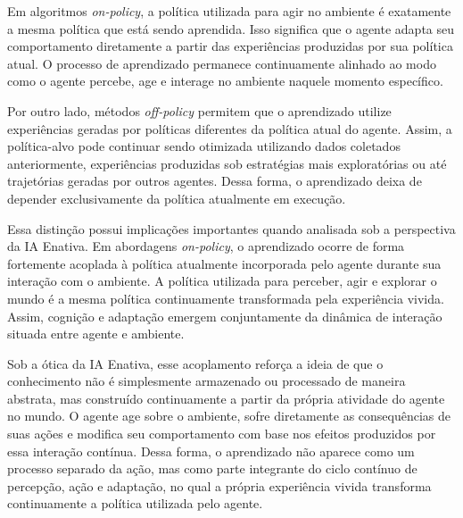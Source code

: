 Em algoritmos \textit{on-policy}, a política utilizada para agir no ambiente é exatamente a mesma política que está sendo aprendida. Isso significa que o agente adapta seu comportamento diretamente a partir das experiências produzidas por sua política atual. O processo de aprendizado permanece continuamente alinhado ao modo como o agente percebe, age e interage no ambiente naquele momento específico.

Por outro lado, métodos \textit{off-policy} permitem que o aprendizado utilize experiências geradas por políticas diferentes da política atual do agente. Assim, a política-alvo pode continuar sendo otimizada utilizando dados coletados anteriormente, experiências produzidas sob estratégias mais exploratórias ou até trajetórias geradas por outros agentes. Dessa forma, o aprendizado deixa de depender exclusivamente da política atualmente em execução.



Essa distinção possui implicações importantes quando analisada sob a perspectiva da IA Enativa. Em abordagens \textit{on-policy}, o aprendizado ocorre de forma fortemente acoplada à política atualmente incorporada pelo agente durante sua interação com o ambiente. A política utilizada para perceber, agir e explorar o mundo é a mesma política continuamente transformada pela experiência vivida. Assim, cognição e adaptação emergem conjuntamente da dinâmica de interação situada entre agente e ambiente.

Sob a ótica da IA Enativa, esse acoplamento reforça a ideia de que o conhecimento não é simplesmente armazenado ou processado de maneira abstrata, mas construído continuamente a partir da própria atividade do agente no mundo. O agente age sobre o ambiente, sofre diretamente as consequências de suas ações e modifica seu comportamento com base nos efeitos produzidos por essa interação contínua. Dessa forma, o aprendizado não aparece como um processo separado da ação, mas como parte integrante do ciclo contínuo de percepção, ação e adaptação, no qual a própria experiência vivida transforma continuamente a política utilizada pelo agente.

